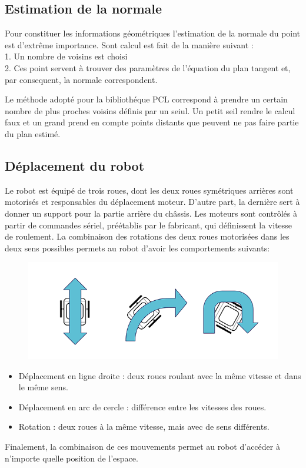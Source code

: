 \subsection{Estimation de la normale}

Pour constituer les informations géométriques l'estimation de la normale du point est d'extrême importance. Sont calcul est fait de la manière suivant :\\
1. Un nombre de voisins est choisi \\
2. Ces point servent à trouver des paramètres de l'équation du plan tangent et, par consequent, la normale correspondent.

Le méthode adopté pour la bibliothéque PCL correspond à prendre un certain nombre de plus proches voisins définis par un seiul. Un petit seil rendre le calcul faux et un grand prend en compte points distants que peuvent ne pas faire partie du plan estimé.\\

\subsection{Déplacement du robot}

Le robot est équipé de trois roues, dont les deux roues symétriques
arrières sont motorisés et responsables du déplacement
moteur. D'autre part, la dernière sert à donner un support pour
la partie arrière du châssis. Les moteurs sont contrôlés à
partir de commandes sériel, préétablis par le fabricant, qui
définissent la vitesse de roulement. La combinaison des rotations
des deux roues motorisées dans les deux sens possibles permets au
robot d'avoir les comportements suivants:

\begin{figure}[H]
\includegraphics[width=\textwidth]{wbot_mov.png}
\end{figure}
\begin {itemize}
\item Déplacement en ligne droite : deux roues roulant avec la même vitesse et dans le même sens.

\item Déplacement en arc de cercle : différence entre les vitesses des roues.

\item Rotation : deux roues à la même vitesse, mais avec de sens différents.
\end{itemize}

Finalement, la combinaison de ces mouvements permet au robot d'accéder à n'importe quelle position de l’espace.